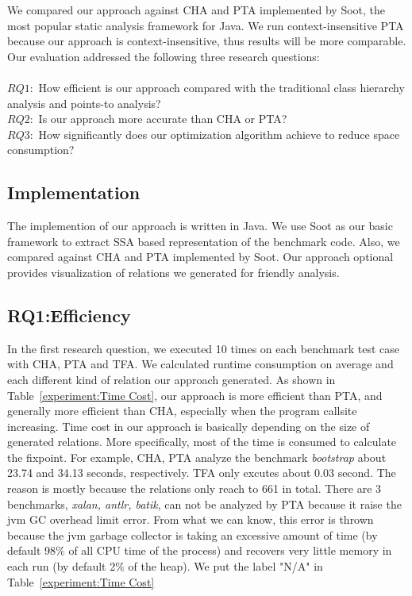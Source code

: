 \documentclass{llncs}
\begin{document}
We compared our approach against CHA and PTA implemented by Soot, the most popular static analysis framework for Java. We run context-insensitive PTA because our approach is context-insensitive, thus results will be more comparable. Our evaluation addressed the following three research questions:\\
\\
$RQ 1:$ How efficient is our approach compared with the traditional class hierarchy analysis and points-to analysis?
\\
$RQ 2:$ Is our approach more accurate than CHA or PTA?
\\
$RQ 3:$ How significantly does our optimization algorithm achieve to reduce space consumption?
\\
\subsection{Implementation}\label{subsec:implementation}
The implemention of our approach is written in Java. We use Soot as our basic framework to extract SSA based representation of the benchmark code. Also, we compared against CHA and PTA implemented by Soot. Our approach optional provides visualization of relations we generated for friendly analysis.

\subsection{RQ1:Efficiency}\label{subsec:efficiency}
In the first research question, we executed 10 times on each benchmark test case with CHA, PTA and TFA. We calculated runtime consumption on average and each different kind of relation our approach generated. As shown in Table~\ref{experiment:Time Cost}, our approach is more efficient than PTA, and generally more efficient than CHA, especially when the program callsite increasing. Time cost in our approach is basically depending on the size of generated relations. More specifically, most of the time is consumed to calculate the fixpoint. For example, CHA, PTA analyze the benchmark \textit{bootstrap} about 23.74 and 34.13 seconds, respectively. TFA only excutes about 0.03 second. The reason is mostly because the relations only reach to 661 in total. There are 3 benchmarks, \textit{xalan, antlr, batik}, can not be analyzed by PTA because it raise the jvm GC overhead limit error. From what we can know, this error is thrown because the jvm garbage collector is taking an excessive amount of time (by default 98$\%$ of all CPU time of the process) and recovers very little memory in each run (by default 2$\%$ of the heap). We put the label "N/A" in Table~\ref{experiment:Time Cost}
\end{document}
